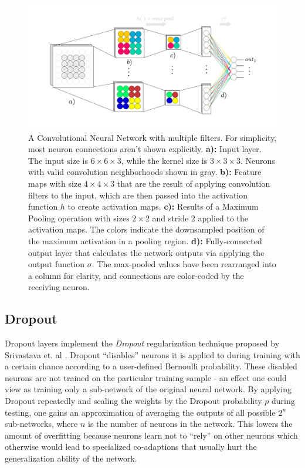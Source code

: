 \begin {figure}[!ht]
	\begin{center}
		\includegraphics[scale=0.75]{img/fig_convnet}
	\end{center}
	\caption{A Convolutional Neural Network with multiple filters. For simplicity, most neuron connections aren't shown explicitly. \textbf{a):} Input layer. The input size is $6 \times 6 \times 3$, while the kernel size is $3 \times 3 \times 3$. Neurons with valid convolution neighborhoods shown in gray. \textbf{b):} Feature maps with size $4 \times 4 \times 3$ that are the result of applying convolution filters to the input, which are then passed into the activation function $h$ to create activation maps. \textbf{c):} Results of a Maximum Pooling operation with sizes $2 \times 2$ and stride $2$ applied to the activation maps. The colors indicate the downsampled position of the maximum activation in a pooling region. \textbf{d):} Fully-connected output layer that calculates the network outputs via applying the output function $\sigma$. The max-pooled values have been rearranged into a column for clarity, and connections are color-coded by the receiving neuron.}
	\label{fig:convnet}
\end {figure}


		\subsection {Dropout}
\label{subsec:dropout}
Dropout layers implement the \textit{Dropout} regularization technique proposed by Srivastava et. al \cite{dropout}. Dropout ``disables'' neurons it is applied to during training with a certain chance according to a user-defined Bernoulli probability. These disabled neurons are not trained on the particular training sample - an effect one could view as training only a sub-network of the original neural network. By applying Dropout repeatedly and scaling the weights by the Dropout probability $p$ during testing, one gains an approximation of averaging the outputs of all possible $2^n$ sub-networks, where $n$ is the number of neurons in the network. This lowers the amount of overfitting because neurons learn not to ``rely'' on other neurons which otherwise would lead to specialized co-adaptions that usually hurt the generalization ability of the network.


